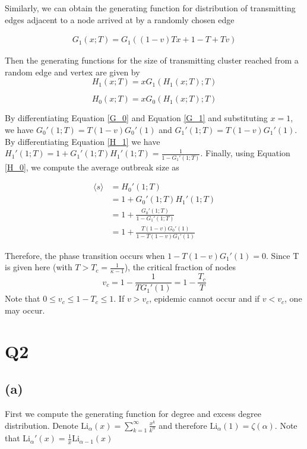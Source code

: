 \documentclass{article}
\begin{document}
Similarly, we can obtain the generating function for distribution of transmitting edges adjacent to a node arrived at by a randomly chosen edge

\begin{equation}\label{G_1}
	\begin{aligned}
		G_1(x;T) = G_1((1-v)Tx + 1 - T + Tv)
	\end{aligned}
\end{equation}

Then the generating functions for the size of transmitting cluster reached from a random edge and vertex are given by
\begin{equation}\label{H_1}
	H_1(x;T) = xG_1(H_1(x;T);T)
\end{equation}

\begin{equation}\label{H_0}
	H_0(x;T) = xG_0(H_1(x;T);T)
\end{equation}

By differentiating Equation \ref{G_0} and Equation \ref{G_1} and substituting $ x=1 $, we have $ G_0'(1;T) = T(1-v)G_0'(1) $ and $ G_1'(1;T) = T(1-v)G_1'(1) $. By differentiating Equation \ref{H_1} we have $ H_1'(1;T) = 1 + G_1'(1;T)H_1'(1;T) = \frac{1}{1-G_1'(1;T)} $. Finally, using Equation \ref{H_0}, we compute the average outbreak size as 

\begin{equation}\label{eq: avg outbreak size}
	\begin{aligned}
		\langle s \rangle & = H_0'(1;T) \\
		& = 1 + G_0'(1;T) H_1'(1;T) \\
		& = 1 + \frac{G_0'(1;T)}{1-G_1'(1;T)} \\
		& = 1 + \frac{T(1-v)G_0'(1)}{1 - T(1-v)G_1'(1)}
	\end{aligned}
\end{equation}

Therefore, the phase transition occurs when $ 1 - T(1-v)G_1'(1) = 0 $. Since T is given here (with $ T>T_c =  \frac{1}{\kappa - 1}$), the critical fraction of nodes $$ v_c = 1 - \frac{1}{TG_1'(1)} = 1 - \frac{T_c}{T} $$Note that $0 \leq v_c \leq 1 - T_c \leq1$. If $ v>v_c $, epidemic cannot occur and if $ v<v_c $, one may occur. 

\section*{Q2}

\subsection*{(a)}
First we compute the generating function for degree and excess degree distribution. Denote $ \mathrm{Li}_\alpha(x) =\sum_{k=1}^{\infty} \frac{x^k}{k^\alpha}$ and therefore $ \mathrm{Li}_\alpha(1) = \zeta(\alpha)$. Note that $ \mathrm{Li}_\alpha '(x) = \frac{1}{x}\mathrm{Li}_{\alpha-1}(x) $
\end{document}
